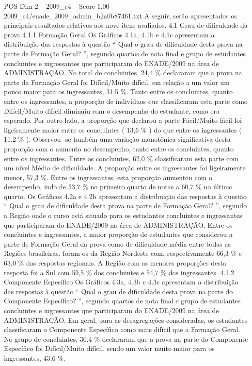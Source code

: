 \begin{textsample}{POS Dim 2 – 2009\_c4 – Score 1.00 – 2009\_c4/enade\_2009\_admin\_b2a0b87461.txt}
A seguir, serão apresentados os principais resultados relativos aos nove itens avaliados. 4.1 Grau de dificuldade da prova 4.1.1 Formação Geral Os Gráficos 4.1a, 4.1b e 4.1c apresentam a distribuição das respostas à questão “ Qual o grau de dificuldade desta prova na parte de Formação Geral? ”, segundo quartos de nota final e grupo de estudantes concluintes e ingressantes que participaram do ENADE/2009 na área de ADMINISTRAÇÃO.
No total de concluintes, 24,4 \% declararam que a prova na parte da Formação Geral foi Difícil/Muito difícil, em relação a um valor um pouco maior para os ingressantes, 31,5 \%.
Tanto entre os concluintes, quanto entre os ingressantes, a proporção de indivíduos que classificaram esta parte como Difícil/Muito difícil diminuiu com o desempenho do estudante, como era esperado.
Por outro lado, a proporção que declarou a parte Fácil/Muito fácil foi ligeiramente maior entre os concluintes ( 13,6 \% ) do que entre os ingressantes ( 11,2 \% ).
Observou -se também uma variação monotônica significativa desta proporção com o aumento no desempenho, tanto entre os concluintes, quanto entre os ingressantes.
Entre os concluintes, 62,0 \% classificaram esta parte com um nível Médio de dificuldade.
A proporção entre os ingressantes foi ligeiramente menor, 57,3 \%.
Entre os ingressantes, esta proporção aumentou com o desempenho, indo de 53,7 \% no primeiro quarto de notas a 60,7 \% no último quarto.
Os Gráficos 4.2a e 4.2b apresentam a distribuição das respostas à questão “ Qual o grau de dificuldade desta prova na parte de Formação Geral? ”, segundo a Região onde o curso está situado para os estudantes concluintes e ingressantes que participaram do ENADE/2009 na área de ADMINISTRAÇÃO.
Entre os concluintes e ingressantes, a maior proporção de estudantes que considerou a parte de Formação Geral da prova como de dificuldade média entre todas as Regiões brasileiras, foram os da Região Nordeste com, respectivamente 66,3 \% e 63,0 \% das respostas regionais.
A Região com as menores proporções desta resposta foi a Sul com 59,5 \% dos concluintes e 54,7 \% dos ingressantes. 4.1.2 Componente Específico Os Gráficos 4.3a, 4.3b e 4.3c apresentam a distribuição das respostas à questão “ Qual o grau de dificuldade desta prova na parte do Componente Específico? ”, segundo quartos de nota final e grupo de estudantes concluintes e ingressantes que participaram do ENADE/2009 na área de ADMINISTRAÇÃO.
Em geral, para as desagregações consideradas, os estudantes classificaram o Componente Específico como mais difícil que a Formação Geral.
No grupo de concluintes, 30,4 \% declararam que a prova na parte do Componente Específico foi Difícil/Muito difícil, sendo um valor muito maior para os ingressantes, 43,6 \%.

\end{textsample}
